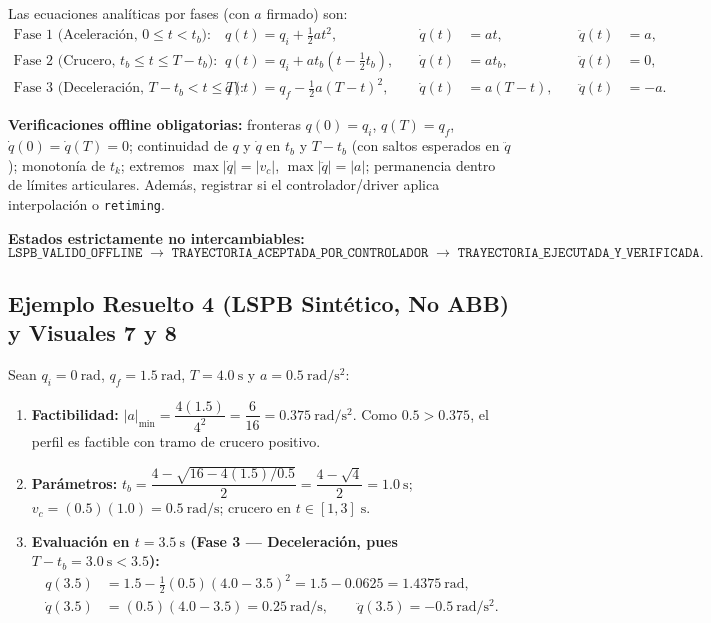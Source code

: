 \documentclass[10pt, a4paper]{article}
\begin{document}
Las ecuaciones analíticas por fases (con $a$ firmado) son:
\begin{equation}
\begin{aligned}
    \text{Fase 1 (Aceleración, } 0 \le t < t_b\text{):}\quad &
    q(t) = q_i + \tfrac{1}{2}a t^2, \quad & \dot{q}(t) &= a t, \quad & \ddot{q}(t) &= a, \\
    \text{Fase 2 (Crucero, } t_b \le t \le T - t_b\text{):}\quad &
    q(t) = q_i + a t_b\!\left(t - \tfrac{1}{2}t_b\right), \quad & \dot{q}(t) &= a t_b, \quad & \ddot{q}(t) &= 0, \\
    \text{Fase 3 (Deceleración, } T - t_b < t \le T\text{):}\quad &
    q(t) = q_f - \tfrac{1}{2}a(T - t)^2, \quad & \dot{q}(t) &= a(T - t), \quad & \ddot{q}(t) &= -a.
\end{aligned}
\label{eq:lspb_phases}
\end{equation}

\textbf{Verificaciones offline obligatorias:} fronteras $q(0)=q_i$, $q(T)=q_f$, $\dot{q}(0)=\dot{q}(T)=0$; continuidad de $q$ y $\dot{q}$ en $t_b$ y $T-t_b$ (con saltos esperados en $\ddot{q}$); monotonía de $t_k$; extremos $\max|\dot{q}|=|v_c|$, $\max|\ddot{q}|=|a|$; permanencia dentro de límites articulares. Además, registrar si el controlador/driver aplica interpolación o \texttt{retiming}.

\textbf{Estados estrictamente no intercambiables:}
\[
    \texttt{LSPB\_VALIDO\_OFFLINE} \;\longrightarrow\; \texttt{TRAYECTORIA\_ACEPTADA\_POR\_CONTROLADOR} \;\longrightarrow\; \texttt{TRAYECTORIA\_EJECUTADA\_Y\_VERIFICADA}.
\]

\subsection{Ejemplo Resuelto 4 (LSPB Sintético, No ABB) y Visuales 7 y 8}
Sean $q_i = \SI{0}{\radian}$, $q_f = \SI{1.5}{\radian}$, $T = \SI{4.0}{\second}$ y $a = \SI{0.5}{\radian\per\second\squared}$:
\begin{enumerate}[leftmargin=*, itemsep=1pt]
    \item \textbf{Factibilidad:} $|a|_{\min} = \dfrac{4(1.5)}{4^2} = \dfrac{6}{16} = \SI{0.375}{\radian\per\second\squared}$. Como $0.5 > 0.375$, el perfil es factible con tramo de crucero positivo.
    \item \textbf{Parámetros:} $t_b = \dfrac{4 - \sqrt{16 - 4(1.5)/0.5}}{2} = \dfrac{4 - \sqrt{4}}{2} = \SI{1.0}{\second}$; $v_c = (0.5)(1.0) = \SI{0.5}{\radian\per\second}$; crucero en $t \in [1, 3]\;\mathrm{s}$.
    \item \textbf{Evaluación en $t = \SI{3.5}{\second}$ (Fase 3 — Deceleración, pues $T - t_b = \SI{3.0}{\second} < 3.5$):}
    \begin{align*}
        q(3.5) &= 1.5 - \tfrac{1}{2}(0.5)(4.0 - 3.5)^2 = 1.5 - 0.0625 = \SI{1.4375}{\radian}, \\
        \dot{q}(3.5) &= (0.5)(4.0 - 3.5) = \SI{0.25}{\radian\per\second}, \qquad
        \ddot{q}(3.5) = \SI{-0.5}{\radian\per\second\squared}.
    \end{align*}
\end{enumerate}
\end{document}
